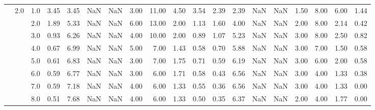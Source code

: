 \begin{tabular}{lllrrrrrrrrrrrrrrrr}
      & 2.0 & 1.0  &      3.45 &       3.45 &               NaN &                NaN & 3.00 &  11.00 &             4.50 &                         3.54 &      2.39 &       2.39 &               NaN &                NaN & 1.50 &   8.00 &             6.00 &                         1.44 \\
      &     & 2.0  &      1.89 &       5.33 &               NaN &                NaN & 6.00 &  13.00 &             2.00 &                         1.13 &      1.60 &       4.00 &               NaN &                NaN & 2.00 &   8.00 &             2.14 &                         0.42 \\
      &     & 3.0  &      0.93 &       6.26 &               NaN &                NaN & 4.00 &  10.00 &             2.00 &                         0.89 &      1.07 &       5.23 &               NaN &                NaN & 3.00 &   8.00 &             2.50 &                         0.82 \\
      &     & 4.0  &      0.67 &       6.99 &               NaN &                NaN & 5.00 &   7.00 &             1.43 &                         0.58 &      0.70 &       5.88 &               NaN &                NaN & 3.00 &   7.00 &             1.50 &                         0.58 \\
      &     & 5.0  &      0.61 &       6.83 &               NaN &                NaN & 3.00 &   7.00 &             1.75 &                         0.71 &      0.59 &       6.19 &               NaN &                NaN & 3.00 &   6.00 &             2.00 &                         0.58 \\
      &     & 6.0  &      0.59 &       6.77 &               NaN &                NaN & 3.00 &   6.00 &             1.71 &                         0.58 &      0.43 &       6.56 &               NaN &                NaN & 3.00 &   4.00 &             1.33 &                         0.38 \\
      &     & 7.0  &      0.59 &       7.18 &               NaN &                NaN & 4.00 &   6.00 &             1.33 &                         0.55 &      0.36 &       6.56 &               NaN &                NaN & 3.00 &   4.00 &             1.33 &                         0.00 \\
      &     & 8.0  &      0.51 &       7.68 &               NaN &                NaN & 4.00 &   6.00 &             1.33 &                         0.50 &      0.35 &       6.37 &               NaN &                NaN & 2.00 &   4.00 &             1.77 &                         0.00 \\

\end{tabular}
